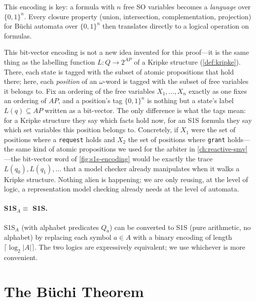 This encoding is key: a formula with $n$ free SO variables becomes a
\emph{language} over $\{0,1\}^n$.  Every closure property (union,
intersection, complementation, projection) for Büchi automata over
$\{0,1\}^n$ then translates directly to a logical operation on formulas.

\begin{remark}
This bit-vector encoding is not a new idea invented for this proof---it
is the same thing as the labelling function
$L : Q \to 2^{AP}$ of a Kripke structure (\cref{def:kripke}).  There,
each state is tagged with the subset of atomic propositions that hold
there; here, each \emph{position} of an $\omega$-word is tagged with the
subset of free variables it belongs to. Fix an ordering of the free
variables $X_1, \ldots, X_n$ exactly as one fixes an ordering of $AP$,
and a position's tag $\{0,1\}^n$ is nothing but a state's label
$L(q) \subseteq AP$ written as a bit-vector. The only difference is what
the tags mean: for a Kripke structure they say which facts hold now, for
an S1S formula they say which set variables this position belongs to.
Concretely, if $X_1$ were the set of positions where a \texttt{request}
holds and $X_2$ the set of positions where \texttt{grant} holds---the
same kind of atomic propositions we used for the arbiter in
\cref{ch:reactive-smv}---the bit-vector word of \cref{fig:s1s-encoding}
would be exactly the trace $L(q_0), L(q_1), \ldots$ that a model checker
already manipulates when it walks a Kripke structure. Nothing alien is
happening; we are only reusing, at the level of logic, a representation
model checking already needs at the level of automata.
\end{remark}

\paragraph{S1S$_A \equiv$ S1S.}
S1S$_A$ (with alphabet predicates $Q_a$) can be converted to S1S (pure
arithmetic, no alphabet) by replacing each symbol $a \in A$ with a binary
encoding of length $\lceil \log_2 |A| \rceil$.  The two logics are
expressively equivalent; we use whichever is more convenient.

\section{The Büchi Theorem}
\label{sec:buchi-theorem}


